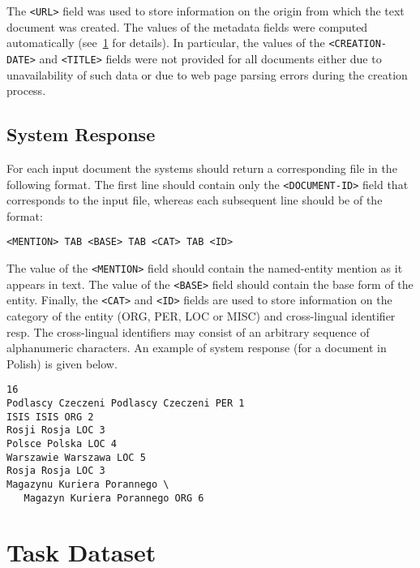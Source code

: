 \documentclass[11pt]{article}
\begin{document}
\noindent The \verb+<URL>+ field was used to store information on the origin from which 
the text document was created. The values of the metadata fields were computed automatically 
(see~\ref{sec:annotation} for details). In particular, the values of the \verb+<CREATION-DATE>+ 
and \verb+<TITLE>+ fields were not provided for all documents either due to unavailability 
of such data or due to web page parsing errors during the creation process. 

\subsection{System Response}
\label{subsec:input}

For each input document the systems should return a corresponding file in the following format.
The first line should contain only the \verb+<DOCUMENT-ID>+ field that corresponds to the input file,
whereas each subsequent line should be of the format:

\begin{small}
\begin{verbatim}
<MENTION> TAB <BASE> TAB <CAT> TAB <ID>
\end{verbatim}
\end{small}

\noindent The value of the \verb+<MENTION>+ field should contain the named-entity mention as it 
appears in text. The value of the \verb+<BASE>+ field should contain the base form of the
entity. Finally, the \verb+<CAT>+ and \verb+<ID>+ fields are used to store information
on the category of the entity (ORG, PER, LOC or MISC) and cross-lingual identifier resp. 
The cross-lingual identifiers may consist of an arbitrary sequence of alphanumeric characters.
An example of system response (for a document in Polish) is given below.

\begin{small}
\begin{verbatim}
16
Podlascy Czeczeni Podlascy Czeczeni PER 1
ISIS ISIS ORG 2
Rosji Rosja LOC 3
Polsce Polska LOC 4
Warszawie Warszawa LOC 5
Rosja Rosja LOC 3
Magazynu Kuriera Porannego \
   Magazyn Kuriera Porannego ORG 6
\end{verbatim}	    
\end{small}

\section{Task Dataset}
\label{sec:annotation}
\end{document}

